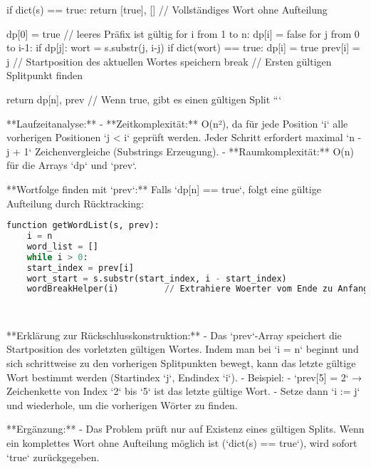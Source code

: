 if dict(s) == true: return [true], []  // Vollständiges Wort ohne Aufteilung

dp[0] = true   // leeres Präfix ist gültig
for i from 1 to n:
dp[i] = false
for j from 0 to i-1:
if dp[j]:
wort = s.substr(j, i-j)
if dict(wort) == true:
dp[i] = true
prev[i] = j   // Startposition des aktuellen Wortes speichern
break        // Ersten gültigen Splitpunkt finden

return dp[n], prev           // Wenn true, gibt es einen gültigen Split
```

**Laufzeitanalyse:**  
- **Zeitkomplexität:** O(n²), da für jede Position `i` alle vorherigen Positionen `j < i` geprüft 
werden. Jeder Schritt erfordert maximal `n - j + 1` Zeichenvergleiche (Substrings Erzeugung).  
- **Raumkomplexität:** O(n) für die Arrays `dp` und `prev`.  

**Wortfolge finden mit `prev`:**  
Falls `dp[n] == true`, folgt eine gültige Aufteilung durch Rücktracking:  
\begin{lstlisting}[language=Python]
function getWordList(s, prev):
	i = n
	word_list = []
	while i > 0:
	start_index = prev[i]
	wort_start = s.substr(start_index, i - start_index)
	wordBreakHelper(i)         // Extrahiere Woerter vom Ende zu Anfang durch Rueckwaertsgang

\end{lstlisting}
~~~

**Erklärung zur Rückschlusskonstruktion:**  
- Das `prev`-Array speichert die Startposition des vorletzten gültigen Wortes. Indem man bei `i = n` 
beginnt und sich schrittweise zu den vorherigen Splitpunkten bewegt, kann das letzte gültige Wort 
bestimmt werden (Startindex `j`, Endindex `i`).  
- Beispiel:  
- `prev[5] = 2` → Zeichenkette von Index `2` bis `5` ist das letzte gültige Wort.  
- Setze dann `i := j` und wiederhole, um die vorherigen Wörter zu finden.  

**Ergänzung:**  
- Das Problem prüft nur auf Existenz eines gültigen Splits. Wenn ein komplettes Wort ohne Aufteilung 
möglich ist (`dict(s) == true`), wird sofort `true` zurückgegeben.